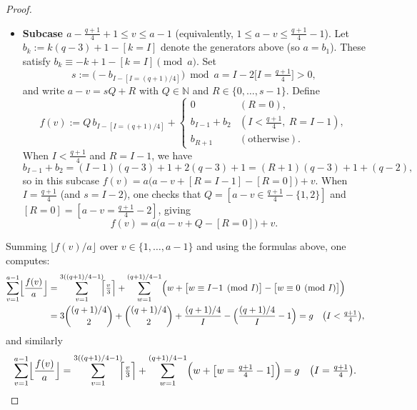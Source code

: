 \documentclass[12pt]{amsart}
\theoremstyle{remark}
\theoremstyle{definition}
\newcommand{\coloneqq}{\mathrel{:=}}
\begin{document}
\begin{proof}
\begin{itemize}
        \item \textbf{Subcase $a - \frac{q+1}{4} + 1 \le v \le a-1$} 
        (equivalently, $1 \le a - v \le \frac{q+1}{4} - 1$). 
        Let $b_k \coloneqq k(q-3) + 1 - [k=I]$ denote the generators above 
        (so $a = b_1$). These satisfy 
        $b_k \equiv -k + 1 - [k=I] \pmod{a}$. Set
        \[
            s \coloneqq \bigl(-b_{I - [I=(q+1)/4]}\bigr) \bmod a 
            = I - 2\bigl[I = \tfrac{q+1}{4}\bigr] > 0,
        \]
        and write $a - v = sQ + R$ with $Q \in \mathbb{N}$ and 
        $R \in \{0, \ldots, s-1\}$. Define
        \[
            f(v) \coloneqq Q\, b_{I-[I=(q+1)/4]} + 
            \begin{cases}
                0 & (R = 0), \\
                b_{I-1} + b_2 & (I < \tfrac{q+1}{4},\ R = I-1), \\
                b_{R+1} & (\text{otherwise}).
            \end{cases}
        \]
        When $I < \frac{q+1}{4}$ and $R = I-1$, we have
        \[
            b_{I-1} + b_2 
            = (I-1)(q-3) + 1 + 2(q-3) + 1 
            = (R+1)(q-3) + 1 + (q-2),
        \]
        so in this subcase $f(v) = a\bigl(a - v + [R=I-1] - [R=0]\bigr) + v$.
        When $I = \frac{q+1}{4}$ (and $s = I-2$), one checks that 
        $Q = [a-v \in \frac{q+1}{4} - \{1,2\}]$ and 
        $[R=0] = [a-v = \frac{q+1}{4}-2]$, giving
        \[
            f(v) = a\bigl(a - v + Q - [R=0]\bigr) + v.
        \]
    \end{itemize}

    Summing $\lfloor f(v)/a \rfloor$ over $v \in \{1,\ldots,a-1\}$ 
    and using the formulas above, one computes:
    \begin{align*}
        \sum_{v=1}^{a-1} \Bigl\lfloor \frac{f(v)}{a} \Bigr\rfloor
        &= \sum_{v=1}^{3((q+1)/4-1)} \!\!\Bigl\lceil \tfrac{v}{3} \Bigr\rceil
        + \sum_{w=1}^{(q+1)/4-1} 
        \Bigl(w + \bigl[w \equiv I{-}1 \pmod{I}\bigr] 
        - \bigl[w \equiv 0 \pmod{I}\bigr]\Bigr) \\
        &= 3\binom{(q+1)/4}{2} + \binom{(q+1)/4}{2} 
        + \frac{(q+1)/4}{I} - \Bigl(\frac{(q+1)/4}{I} - 1\Bigr) = g
        \quad \bigl(I < \tfrac{q+1}{4}\bigr),
    \end{align*}
    and similarly
    \[
        \sum_{v=1}^{a-1} \Bigl\lfloor \frac{f(v)}{a} \Bigr\rfloor
        = \sum_{v=1}^{3((q+1)/4-1)} \!\!\Bigl\lceil \tfrac{v}{3} \Bigr\rceil
        + \sum_{w=1}^{(q+1)/4-1} 
        \Bigl(w + \bigl[w = \tfrac{q+1}{4}-1\bigr]\Bigr) = g
        \quad \bigl(I = \tfrac{q+1}{4}\bigr).
    \]


\end{proof}
\end{document}
